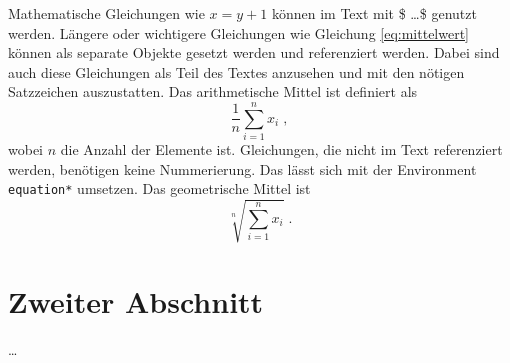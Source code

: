 Mathematische Gleichungen wie $x = y + 1$ können im Text mit \$ \dots \$ genutzt werden.
Längere oder wichtigere Gleichungen wie Gleichung \ref{eq:mittelwert} können als separate Objekte gesetzt werden und referenziert werden.
Dabei sind auch diese Gleichungen als Teil des Textes anzusehen und mit den nötigen Satzzeichen auszustatten.
Das arithmetische Mittel ist definiert als
\begin{equation}
\frac{1}{n} \sum_{i=1}^{n} x_i \; ,
\label{eq:mittelwert}
\end{equation}
wobei $n$ die Anzahl der Elemente ist.
Gleichungen, die nicht im Text referenziert werden, benötigen keine Nummerierung.
Das lässt sich mit der Environment \texttt{equation*} umsetzen.
Das geometrische Mittel ist
\begin{equation*}
	\sqrt[n]{\sum_{i=1}^{n} x_i} \; .
\end{equation*}





\section{Zweiter Abschnitt}
\label{ch:Content2:sec:Section2}

\dots
